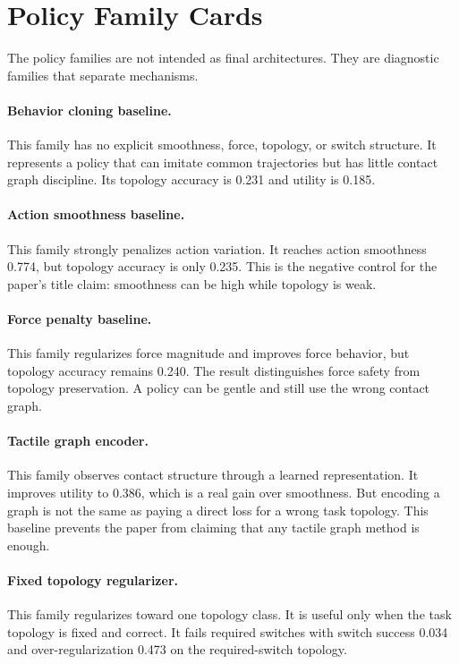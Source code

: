 \documentclass{article}
\begin{document}
\section{Policy Family Cards}

The policy families are not intended as final architectures. They are diagnostic families that separate mechanisms.

\paragraph{Behavior cloning baseline.}
This family has no explicit smoothness, force, topology, or switch structure. It represents a policy that can imitate common trajectories but has little contact graph discipline. Its topology accuracy is 0.231 and utility is 0.185.

\paragraph{Action smoothness baseline.}
This family strongly penalizes action variation. It reaches action smoothness 0.774, but topology accuracy is only 0.235. This is the negative control for the paper's title claim: smoothness can be high while topology is weak.

\paragraph{Force penalty baseline.}
This family regularizes force magnitude and improves force behavior, but topology accuracy remains 0.240. The result distinguishes force safety from topology preservation. A policy can be gentle and still use the wrong contact graph.

\paragraph{Tactile graph encoder.}
This family observes contact structure through a learned representation. It improves utility to 0.386, which is a real gain over smoothness. But encoding a graph is not the same as paying a direct loss for a wrong task topology. This baseline prevents the paper from claiming that any tactile graph method is enough.

\paragraph{Fixed topology regularizer.}
This family regularizes toward one topology class. It is useful only when the task topology is fixed and correct. It fails required switches with switch success 0.034 and over-regularization 0.473 on the required-switch topology.
\end{document}
